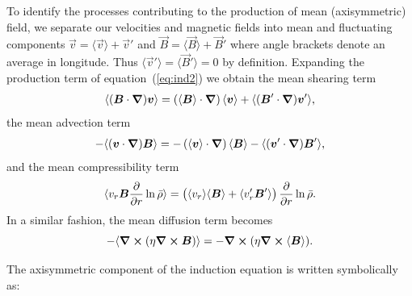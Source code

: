 To identify the processes contributing to the production of mean
(axisymmetric) field, we separate our velocities and magnetic fields
into mean and fluctuating components 
$\vec{v} = \langle \vec{v} \rangle  + \vec{v}' $ and
$\vec{B} = \langle \vec{B} \rangle  + \vec{B}' $ 
where angle brackets denote an average in longitude.  Thus 
$\langle \vec{v}' \rangle = \langle \vec{B}' \rangle = 0$ by definition.
Expanding the production term of equation~(\ref{eq:ind2}) we obtain the
mean shearing term
\begin{equation}
  \langle (\boldsymbol{B}\cdot\mbox{\boldmath $\nabla$})\boldsymbol{v} \rangle = \left( \langle \boldsymbol{B} \rangle \cdot\mbox{\boldmath $\nabla$} \right) \langle \boldsymbol{v} \rangle 
                                    + \langle (\boldsymbol{B}'\cdot\mbox{\boldmath $\nabla$})\boldsymbol{v}' \rangle,
\end{equation}
the mean advection term
\begin{equation}
  -\langle (\boldsymbol{v}\cdot\mbox{\boldmath $\nabla$})\boldsymbol{B} \rangle = -\left( \langle \boldsymbol{v} \rangle \cdot\mbox{\boldmath $\nabla$} \right) \langle \boldsymbol{B} \rangle 
                                       -\langle (\boldsymbol{v}'\cdot\mbox{\boldmath $\nabla$})\boldsymbol{B}' \rangle,
\end{equation}
and the mean compressibility term
\begin{equation}
  \langle v_r\boldsymbol{B}\frac{\partial}{\partial r}\ln \bar{\rho} \rangle = \left( \langle v_r \rangle \langle \boldsymbol{B} \rangle  
                                              +  \langle v_r' \boldsymbol{B}' \rangle \right)\frac{\partial}{\partial r}\ln \bar{\rho}.
\end{equation}
In a similar fashion, the mean diffusion term becomes
\begin{equation}
  -\langle \mbox{\boldmath $\nabla$}\boldsymbol{\times}(\eta\mbox{\boldmath $\nabla$}\boldsymbol{\times}\boldsymbol{B}) \rangle = -\mbox{\boldmath $\nabla$}\boldsymbol{\times}(\eta\mbox{\boldmath $\nabla$}\boldsymbol{\times} \langle \boldsymbol{B} \rangle).
\end{equation}

The axisymmetric component of the induction equation is written
symbolically as:

